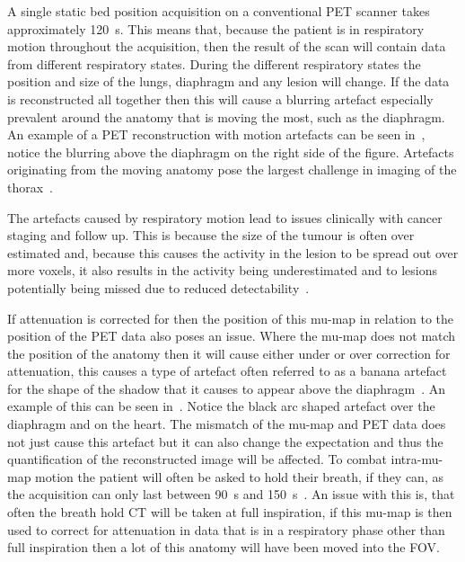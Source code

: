             A single static bed position acquisition on a conventional \gls{PET} scanner takes approximately \SI{120}{\second}. This means that, because the patient is in respiratory motion throughout the acquisition, then the result of the scan will contain data from different respiratory states. During the different respiratory states the position and size of the lungs, diaphragm and any lesion will change. If the data is reconstructed all together then this will cause a blurring artefact especially prevalent around the anatomy that is moving the most, such as the diaphragm. %
            An example of a \gls{PET} reconstruction with motion artefacts can be seen in~, notice the blurring above the diaphragm on the right side of the figure. Artefacts originating from the moving anatomy pose the largest challenge in imaging of the thorax~.
            
            The artefacts caused by respiratory motion lead to issues clinically with cancer staging and follow up. This is because the size of the tumour is often over estimated and, because this causes the activity in the lesion to be spread out over more voxels, it also results in the activity being underestimated and to lesions potentially being missed due to reduced detectability~. %
            
            If attenuation is corrected for then the position of this \gls{mu-map} in relation to the position of the \gls{PET} data also poses an issue. Where the \gls{mu-map} does not match the position of the anatomy then it will cause either under or over correction for attenuation, this causes a type of artefact often referred to as a banana artefact for the shape of the shadow that it causes to appear above the diaphragm~. An example of this can be seen in~. Notice the black arc shaped artefact over the diaphragm and on the heart. The mismatch of the \gls{mu-map} and \gls{PET} data does not just cause this artefact but it can also change the expectation and thus the quantification of the reconstructed image will be affected. To combat intra-\gls{mu-map} motion the patient will often be asked to hold their breath, if they can, as the acquisition can only last between \SI{90}{\second} and \SI{150}{\second}~. An issue with this is, that often the breath hold \gls{CT} will be taken at full inspiration, if this \gls{mu-map} is then used to correct for attenuation in data that is in a respiratory phase other than full inspiration then a lot of this anatomy will have been moved into the \gls{FOV}. %
            
